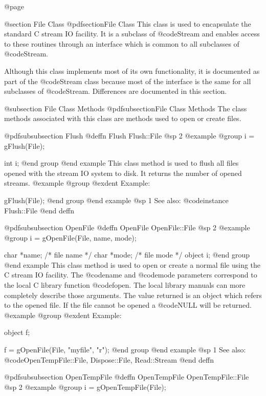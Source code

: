 @page

@section File Class
@pdfsection{File Class}
This class is used to encapsulate the standard C stream IO facility.  It
is a subclass of @code{Stream} and enables access to these routines
through an interface which is common to all subclasses of @code{Stream}.

Although this class implements most of its own functionality, it is
documented as part of the @code{Stream} class because most of the
interface is the same for all subclasses of @code{Stream}.  Differences
are documented in this section.


@subsection File Class Methods
@pdfsubsection{File Class Methods}
The class methods associated with this class are methods used to
open or create files.




@pdfsubsubsection {Flush}
@deffn {Flush} Flush::File
@sp 2
@example
@group
i = gFlush(File);

int  i;
@end group
@end example
This class method is used to flush all files opened with the
stream IO system to disk.  It returns the number of opened
streams.
@example
@group
@exdent Example:

gFlush(File);
@end group
@end example
@sp 1
See also:  @code{instance Flush::File}
@end deffn







@pdfsubsubsection {OpenFile}
@deffn {OpenFile} OpenFile::File
@sp 2
@example
@group
i = gOpenFile(File, name, mode);

char    *name;  /*  file name  */
char    *mode;  /*  file mode  */
object  i;
@end group
@end example
This class method is used to open or create a normal file using the
C stream IO facility.  The @code{name} and @code{mode} parameters
correspond to the local C library function @code{fopen}.  The
local library manuals can more completely describe those arguments.
The value returned is an object which refers to the opened file.
If the file cannot be opened a @code{NULL} will be returned.
@example
@group
@exdent Example:

object  f;

f = gOpenFile(File, "myfile", "r");
@end group
@end example
@sp 1
See also:  @code{OpenTempFile::File, Dispose::File, Read::Stream}
@end deffn





@pdfsubsubsection {OpenTempFile}
@deffn {OpenTempFile} OpenTempFile::File
@sp 2
@example
@group
i = gOpenTempFile(File);

